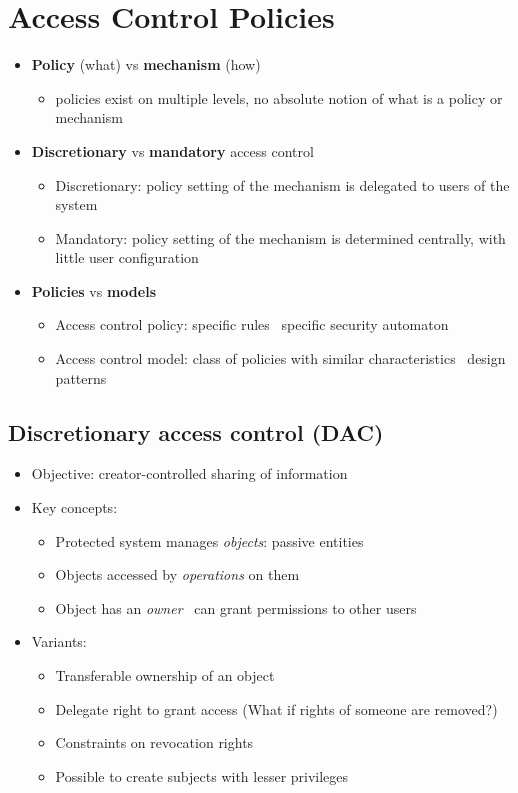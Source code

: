 \documentclass[12pt,titlepage,a4paper]{report}
\begin{document}
		\section{Access Control Policies}
			\begin{itemize}
				\item \textbf{Policy} (what) vs \textbf{mechanism} (how)
				\begin{itemize}
					\item policies exist on multiple levels, no absolute notion of what is a policy or mechanism
				\end{itemize}
				\item \textbf{Discretionary} vs \textbf{mandatory} access control
				\begin{itemize}
					\item Discretionary: policy setting of the mechanism is delegated to users of the system
					\item Mandatory: policy setting of the mechanism is determined centrally, with little user configuration
				\end{itemize}
				\item \textbf{Policies} vs \textbf{models}
				\begin{itemize}
					\item Access control policy: specific rules \textrightarrow \, specific security automaton
					\item Access control model: class of policies with similar characteristics \textrightarrow \, design patterns
				\end{itemize}
			\end{itemize}

			\subsection{Discretionary access control (DAC)}
			\begin{itemize}
				\item Objective: creator-controlled sharing of information
				\item Key concepts:
				\begin{itemize}
					\item Protected system manages \textit{objects}: passive entities
					\item Objects accessed by \textit{operations} on them
					\item Object has an \textit{owner} \textrightarrow \, can grant permissions to other users
				\end{itemize}
				\item Variants:
				\begin{itemize}
					\item Transferable ownership of an object
					\item Delegate right to grant access (What if rights of someone are removed?)
					\item Constraints on revocation rights
					\item Possible to create subjects with lesser privileges
				\end{itemize}
			\end{itemize}
\end{document}
